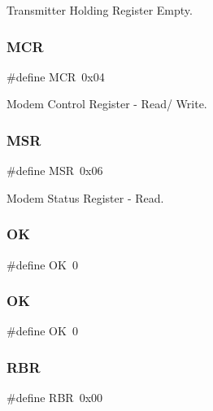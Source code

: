 Transmitter Holding Register Empty. 

\hypertarget{group___serial_ga65364db1603cde6f6533cb61bcfcf553}{}\label{group___serial_ga65364db1603cde6f6533cb61bcfcf553} 
\subsubsection{\texorpdfstring{M\+CR}{MCR}}
{\footnotesize\ttfamily \#define M\+CR~0x04}



Modem Control Register -\/ Read/ Write. 

\hypertarget{group___serial_gad4806a0bfd996121bc27d2466393207e}{}\label{group___serial_gad4806a0bfd996121bc27d2466393207e} 
\subsubsection{\texorpdfstring{M\+SR}{MSR}}
{\footnotesize\ttfamily \#define M\+SR~0x06}



Modem Status Register -\/ Read. 

\hypertarget{group___serial_gaba51915c87d64af47fb1cc59348961c9}{}\label{group___serial_gaba51915c87d64af47fb1cc59348961c9} 
\subsubsection{\texorpdfstring{OK}{OK}\hspace{0.1cm}{\footnotesize\ttfamily [1/2]}}
{\footnotesize\ttfamily \#define OK~0}

\hypertarget{group___serial_gaba51915c87d64af47fb1cc59348961c9}{}\label{group___serial_gaba51915c87d64af47fb1cc59348961c9} 
\subsubsection{\texorpdfstring{OK}{OK}\hspace{0.1cm}{\footnotesize\ttfamily [2/2]}}
{\footnotesize\ttfamily \#define OK~0}

\hypertarget{group___serial_gaa6f7e7a9f4551d6151f9d45362118a50}{}\label{group___serial_gaa6f7e7a9f4551d6151f9d45362118a50} 
\subsubsection{\texorpdfstring{R\+BR}{RBR}}
{\footnotesize\ttfamily \#define R\+BR~0x00}



